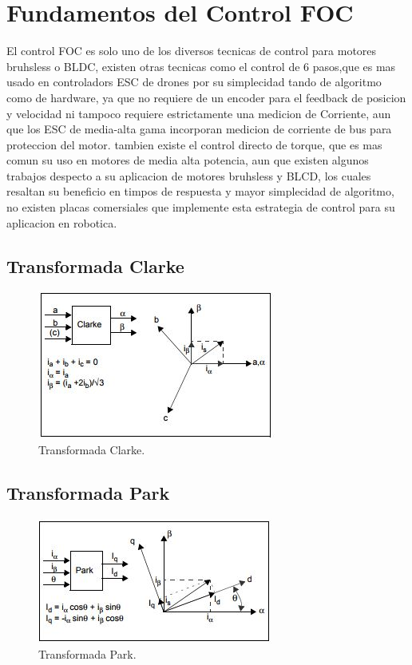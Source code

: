 \documentclass[11pt]{report}
\begin{document}
\section{Fundamentos del Control FOC}

El control FOC es solo uno de los diversos tecnicas de control para motores bruhsless o BLDC, existen otras tecnicas como el control de 6 pasos,que es mas usado en controladors ESC de drones por su simplecidad tando de algoritmo como de hardware, ya que no requiere de un encoder para el feedback de posicion y velocidad ni tampoco requiere estrictamente una medicion de Corriente, aun que los ESC de media-alta gama incorporan medicion de corriente de bus para proteccion del motor. tambien existe el control directo de torque, que es mas comun su uso en motores de media alta potencia, aun que existen algunos trabajos despecto a su aplicacion de motores bruhsless y BLCD, los cuales resaltan su beneficio en timpos de respuesta y mayor simplecidad de algoritmo, no existen placas comersiales que implemente esta estrategia de control para su aplicacion en robotica.

\subsection{Transformada Clarke}
\begin{figure}[ht]
	\centering
	\includegraphics{imagenes/clarke.jpg}
	\caption{Transformada Clarke.}
\end{figure}
\FloatBarrier

\subsection{Transformada Park}
\begin{figure}[ht]
	\centering
	\includegraphics{imagenes/park.jpg}
	\caption{Transformada Park.}
\end{figure}
\FloatBarrier
\end{document}
